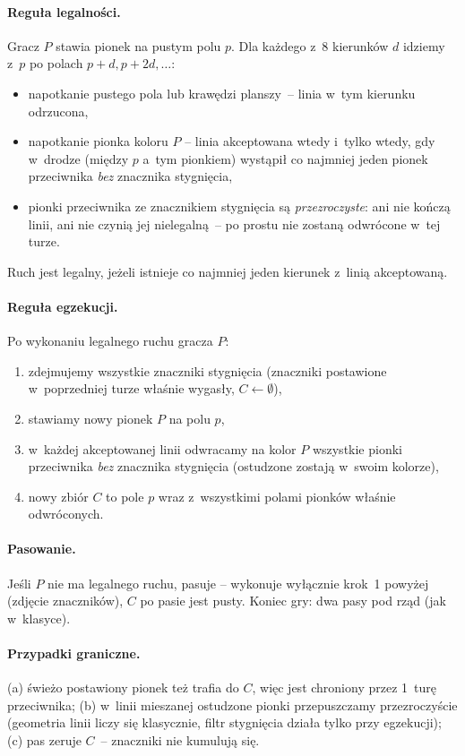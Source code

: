 \documentclass[11pt,a4paper]{article}
\begin{document}
\paragraph{Reguła legalności.} Gracz $P$ stawia pionek na pustym polu $p$. Dla każdego z~8 kierunków $d$ idziemy z~$p$ po polach $p+d, p+2d, \dots$:
\begin{itemize}[leftmargin=1.5em,itemsep=2pt]
    \item napotkanie pustego pola lub krawędzi planszy~-- linia w~tym kierunku odrzucona,
    \item napotkanie pionka koloru $P$ -- linia akceptowana wtedy i~tylko wtedy, gdy w~drodze (między $p$ a~tym pionkiem) wystąpił co najmniej jeden pionek przeciwnika \emph{bez} znacznika stygnięcia,
    \item pionki przeciwnika ze znacznikiem stygnięcia są \emph{przezroczyste}: ani nie kończą linii, ani nie czynią jej nielegalną~-- po prostu nie zostaną odwrócone w~tej turze.
\end{itemize}
Ruch jest legalny, jeżeli istnieje co najmniej jeden kierunek z~linią akceptowaną.

\paragraph{Reguła egzekucji.} Po wykonaniu legalnego ruchu gracza $P$:
\begin{enumerate}[leftmargin=1.5em,itemsep=2pt]
    \item zdejmujemy wszystkie znaczniki stygnięcia (znaczniki postawione w~poprzedniej turze właśnie wygasły, $C \leftarrow \emptyset$),
    \item stawiamy nowy pionek $P$ na polu $p$,
    \item w~każdej akceptowanej linii odwracamy na kolor $P$ wszystkie pionki przeciwnika \emph{bez} znacznika stygnięcia (ostudzone zostają w~swoim kolorze),
    \item nowy zbiór $C$ to pole $p$ wraz z~wszystkimi polami pionków właśnie odwróconych.
\end{enumerate}

\paragraph{Pasowanie.} Jeśli $P$ nie ma legalnego ruchu, pasuje -- wykonuje wyłącznie krok~1 powyżej (zdjęcie znaczników), $C$ po pasie jest pusty. Koniec gry: dwa pasy pod rząd (jak w~klasyce).

\paragraph{Przypadki graniczne.} (a) świeżo postawiony pionek też trafia do $C$, więc jest chroniony przez 1~turę przeciwnika; (b) w~linii mieszanej ostudzone pionki przepuszczamy przezroczyście (geometria linii liczy się klasycznie, filtr stygnięcia działa tylko przy egzekucji); (c) pas zeruje $C$~-- znaczniki nie kumulują się.
\end{document}
